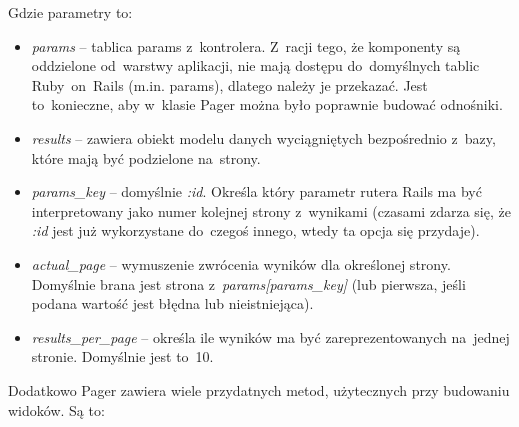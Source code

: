 \documentclass[a4paper,12pt,oneside]{report}
\begin{document}
Gdzie parametry to:
\begin{itemize}
  \item \emph{params} -- tablica params z~kontrolera. Z~racji tego, że komponenty są oddzielone od~warstwy aplikacji, nie mają dostępu do~domyślnych tablic Ruby~on~Rails (m.in. params), dlatego należy je przekazać. Jest to~konieczne, aby w~klasie Pager można było poprawnie budować odnośniki.
  \item \emph{results} -- zawiera obiekt modelu danych wyciągniętych bezpośrednio z~bazy, które mają być podzielone na~strony.
  \item \emph{params\_key} -- domyślnie \emph{:id}. Określa który parametr rutera Rails ma być interpretowany jako numer kolejnej strony z~wynikami (czasami zdarza się, że \emph{:id} jest już wykorzystane do~czegoś innego, wtedy ta opcja się przydaje).
  \item \emph{actual\_page} -- wymuszenie zwrócenia wyników dla określonej strony. Domyślnie brana jest strona z~\emph{params[params\_key]} (lub pierwsza, jeśli podana wartość jest błędna lub nieistniejąca).
  \item \emph{results\_per\_page} -- określa ile wyników ma być zareprezentowanych na~jednej stronie. Domyślnie jest to~10.
\end{itemize}
Dodatkowo Pager zawiera wiele przydatnych metod, użytecznych przy budowaniu widoków. Są to:
\end{document}
